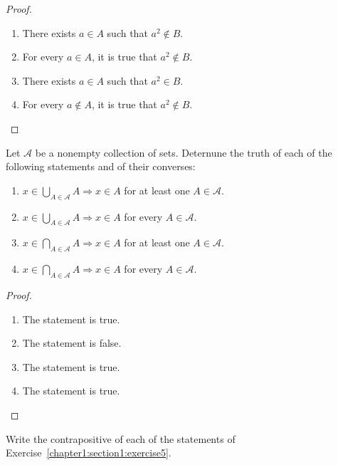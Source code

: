 \begin{proof}
    \begin{enumerate}[label={(\alph*)}]
        \item There exists $a\in A$ such that $a^{2}\notin B$.
        \item For every $a\in A$, it is true that $a^{2}\notin B$.
        \item There exists $a\in A$ such that $a^{2}\in B$.
        \item For every $a\notin A$, it is true that $a^{2}\notin B$.
    \end{enumerate}
\end{proof}

\begin{exercise}\label{chapter1:section1:exercise5}
    Let $\mathscr{A}$ be a nonempty collection of sets. Deternune the truth of each of the following statements and of their converses:
    \begin{enumerate}[label={(\alph*)}]
        \item $x\in \bigcup_{A\in\mathscr{A}}A \Rightarrow x\in A$ for at least one $A\in\mathscr{A}$.
        \item $x\in \bigcup_{A\in\mathscr{A}}A \Rightarrow x\in A$ for every $A\in\mathscr{A}$.
        \item $x\in \bigcap_{A\in\mathscr{A}}A \Rightarrow x\in A$ for at least one $A\in\mathscr{A}$.
        \item $x\in \bigcap_{A\in\mathscr{A}}A \Rightarrow x\in A$ for every $A\in\mathscr{A}$.
    \end{enumerate}
\end{exercise}

\begin{proof}
    \begin{enumerate}[label={(\alph*)}]
        \item The statement is true.
        \item The statement is false.
        \item The statement is true.
        \item The statement is true.
    \end{enumerate}
\end{proof}

\begin{exercise}\label{chapter1:section1:exercise6}
    Write the contrapositive of each of the statements of Exercise~\ref{chapter1:section1:exercise5}.
\end{exercise}

